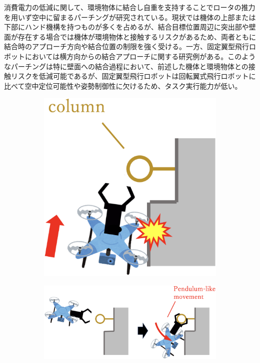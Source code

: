 \documentclass{jarticle}
\begin{document}
消費電力の低減に関して、環境物体に結合し自重を支持することでロータの推力を用いず空中に留まるパーチングが研究されている。現状では機体の上部または下部にハンド機構を持つものが多くを占めるが、結合目標位置周辺に突出部や壁面が存在する場合では機体が環境物体と接触するリスクがあるため、両者ともに結合時のアプローチ方向や結合位置の制限を強く受ける。一方、固定翼型飛行ロボットにおいては横方向からの結合アプローチに関する研究例がある。このようなパーチングは特に壁面への結合過程において、前述した機体と環境物体との接触リスクを低減可能であるが、固定翼型飛行ロボットは回転翼式飛行ロボットに比べて空中定位可能性や姿勢制御性に欠けるため、タスク実行能力が低い。

\begin{figure}[tb]
  \centering
  \begin{subfigure}{0.25\columnwidth}
    \includegraphics[width=\textwidth]{figs/collision.eps}
    \vspace{-6mm}
    \caption{}
    \label{fig:pgimage}
  \end{subfigure}
  \begin{subfigure}{0.68\columnwidth}
    \includegraphics[width=\textwidth]{figs/perching_grasping.eps}

\end{subfigure}
\end{figure}
\end{document}
